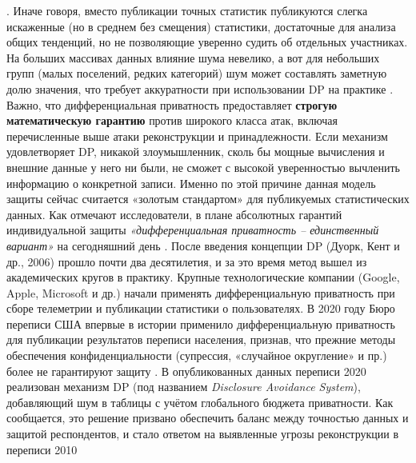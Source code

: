 \autocite{census-gov}
. Иначе говоря, вместо публикации точных статистик публикуются слегка искаженные (но в среднем без смещения) статистики, достаточные для анализа общих тенденций, но не позволяющие уверенно судить об отдельных участниках. На больших массивах данных влияние шума невелико, а вот для небольших групп (малых поселений, редких категорий) шум может составлять заметную долю значения, что требует аккуратности при использовании DP на практике
\autocite{blog-seas-upenn-edu}
. Важно, что дифференциальная приватность предоставляет \textbf{строгую математическую гарантию} против широкого класса атак, включая перечисленные выше атаки реконструкции и принадлежности. Если механизм удовлетворяет DP, никакой злоумышленник, сколь бы мощные вычисления и внешние данные у него ни были, не сможет с высокой уверенностью вычленить информацию о конкретной записи. Именно по этой причине данная модель защиты сейчас считается «золотым стандартом» для публикуемых статистических данных. Как отмечают исследователи, в плане абсолютных гарантий индивидуальной защиты \textit{«дифференциальная приватность – единственный вариант»} на сегодняшний день
\autocite{blog-seas-upenn-edu}
. После введения концепции DP (Дуорк, Кент и др., 2006) прошло почти два десятилетия, и за это время метод вышел из академических кругов в практику. Крупные технологические компании (Google, Apple, Microsoft и др.) начали применять дифференциальную приватность при сборе телеметрии и публикации статистики о пользователях. В 2020 году Бюро переписи США впервые в истории применило дифференциальную приватность для публикации результатов переписи населения, признав, что прежние методы обеспечения конфиденциальности (супрессия, «случайное округление» и пр.) более не гарантируют защиту
\autocite{blog-seas-upenn-edu}
. В опубликованных данных переписи 2020 реализован механизм DP (под названием \textit{Disclosure Avoidance System}), добавляющий шум в таблицы с учётом глобального бюджета приватности. Как сообщается, это решение призвано обеспечить баланс между точностью данных и защитой респондентов, и стало ответом на выявленные угрозы реконструкции в переписи 2010
\autocite{census-gov}
\autocite{blog-seas-upenn-edu}
